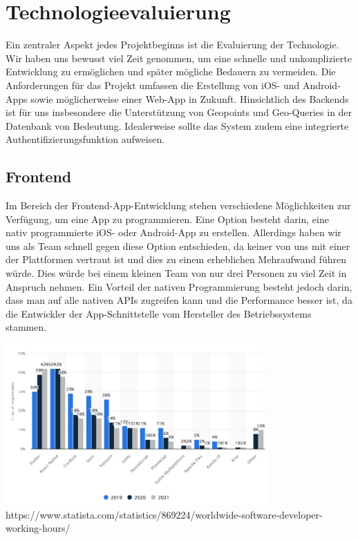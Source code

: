 \author{Martin Hausleitner}
\section{Technologieevaluierung}

Ein zentraler Aspekt jedes Projektbeginns ist die Evaluierung der Technologie. Wir haben uns bewusst viel Zeit genommen, um eine schnelle und unkomplizierte Entwicklung zu ermöglichen und später mögliche Bedauern zu vermeiden. Die Anforderungen für das Projekt umfassen die Erstellung von iOS- und Android-Apps sowie möglicherweise einer Web-App in Zukunft. Hinsichtlich des Backends ist für uns insbesondere die Unterstützung von Geopoints und Geo-Queries in der Datenbank von Bedeutung. Idealerweise sollte das System zudem eine integrierte Authentifizierungsfunktion aufweisen.


\subsection{Frontend}

Im Bereich der Frontend-App-Entwicklung stehen verschiedene Möglichkeiten zur Verfügung, um eine App zu programmieren. Eine Option besteht darin, eine nativ programmierte iOS- oder Android-App zu erstellen. Allerdings haben wir uns als Team schnell gegen diese Option entschieden, da keiner von uns mit einer der Plattformen vertraut ist und dies zu einem erheblichen Mehraufwand führen würde. Dies würde bei einem kleinen Team von nur drei Personen zu viel Zeit in Anspruch nehmen. Ein Vorteil der nativen Programmierung besteht jedoch darin, dass man auf alle nativen APIs zugreifen kann und die Performance besser ist, da die Entwickler der App-Schnittstelle vom Hersteller des Betriebssystems stammen.

\includegraphics[width=0.75\textwidth]{pics/cross-platform-statisitics.png}
https://www.statista.com/statistics/869224/worldwide-software-developer-working-hours/


